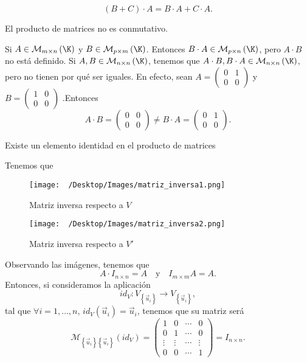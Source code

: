 \[ \left(B + C\right) \cdot A = B \cdot A + C \cdot A.\]
\begin{fprop}[]
\normalfont El producto de matrices no es conmutativo.
\end{fprop}
 Si $\displaystyle A \in \mathcal{M}_{m \times n}\left(\K\right) $ y $\displaystyle B \in \mathcal{M}_{p \times m}\left(\K\right) $. Entonces $\displaystyle B \cdot A \in \mathcal{M}_{p \times n}\left(\K\right) $, pero $\displaystyle A \cdot B $ no está definido. Si $\displaystyle A,B \in \mathcal{M}_{n \times n}\left(\K\right) $, tenemos que $\displaystyle A \cdot B, B \cdot A \in \mathcal{M}_{n \times n}\left(\K\right) $, pero no tienen por qué ser iguales. En efecto, sean 
$ \displaystyle A = \begin{pmatrix} 0 & 1 \\ 0 & 0 \end{pmatrix} $ y $\displaystyle B = \begin{pmatrix} 1 & 0 \\ 0 & 0 \end{pmatrix}$ .Entonces
\[A \cdot B = \begin{pmatrix} 0 & 0 \\ 0 & 0 \end{pmatrix} \neq B \cdot A = \begin{pmatrix} 0 & 1 \\ 0 & 0 \end{pmatrix} .\]
\begin{fprop}[]
\normalfont Existe un elemento identidad en el producto de matrices
\end{fprop}
Tenemos que 
\begin{figure}
\centering
\texttt{[image: ~/Desktop/Images/matriz\_inversa1.png]}
\caption{Matriz inversa respecto a $\displaystyle V $}
\end{figure}
\begin{figure}
\centering
\texttt{[image: ~/Desktop/Images/matriz\_inversa2.png]}
\caption{Matriz inversa respecto a $\displaystyle V' $}
\label{ enter label$}
\end{figure}
Observando las imágenes, tenemos que 
\[A \cdot I_{n \times n} = A \quad \text{y} \quad I_{m \times m }A = A .\]
Entonces, si consideramos la aplicación
\[id _{V} : V_{ \left\{ \vec{u}_{i}\right\}} \to V_{ \left\{ \vec{u}_{i}\right\} } ,\]
tal que $\displaystyle \forall i = 1, \ldots, n $, $\displaystyle id _{V}\left(\vec{u}_{i}\right) = \vec{u}_{i} $, tenemos que su matriz será
\[\mathcal{M}_{ \left\{ \vec{u}_{i}\right\} \left\{ \vec{u}_{i}\right\} }\left(id _{V}\right) = \begin{pmatrix} 1 & 0 & \cdots & 0\\
0 & 1 & \cdots & 0 \\
\vdots & \vdots & \cdots & \vdots \\
0 & 0 & \cdots & 1\end{pmatrix} = I_{n \times n} .\]

